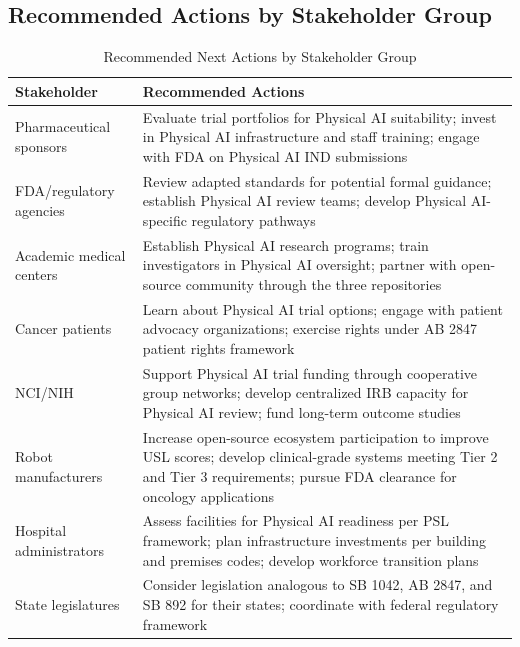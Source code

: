 \clearpage

\subsection{Recommended Actions by Stakeholder Group}
\label{subsec:conclusion-recommendations}

\begin{table}[H]
\centering
\caption{Recommended Next Actions by Stakeholder Group}
\label{tab:recommended-actions}
\small
\begin{tabularx}{\textwidth}{l X}
\toprule
\textbf{Stakeholder} & \textbf{Recommended Actions} \\
\midrule
Pharmaceutical sponsors & Evaluate trial portfolios for Physical AI suitability; invest in Physical AI infrastructure and staff training; engage with FDA on Physical AI IND submissions \\
FDA/regulatory agencies & Review adapted standards for potential formal guidance; establish Physical AI review teams; develop Physical AI-specific regulatory pathways \\
Academic medical centers & Establish Physical AI research programs; train investigators in Physical AI oversight; partner with open-source community through the three repositories \\
Cancer patients & Learn about Physical AI trial options; engage with patient advocacy organizations; exercise rights under AB 2847 patient rights framework \\
NCI/NIH & Support Physical AI trial funding through cooperative group networks; develop centralized IRB capacity for Physical AI review; fund long-term outcome studies \\
Robot manufacturers & Increase open-source ecosystem participation to improve USL scores; develop clinical-grade systems meeting Tier 2 and Tier 3 requirements; pursue FDA clearance for oncology applications \\
Hospital administrators & Assess facilities for Physical AI readiness per PSL framework; plan infrastructure investments per building and premises codes; develop workforce transition plans \\
State legislatures & Consider legislation analogous to SB 1042, AB 2847, and SB 892 for their states; coordinate with federal regulatory framework \\
\bottomrule
\end{tabularx}
\end{table}

